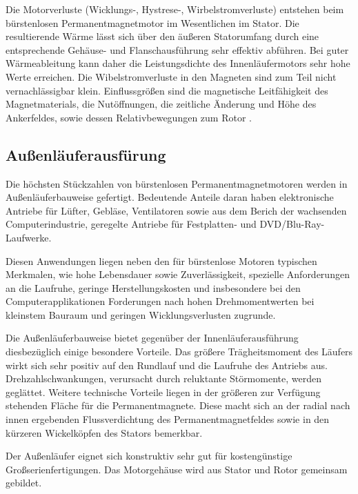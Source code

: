 Die Motorverluste (Wicklungs-, Hystrese-, Wirbelstromverluste) entstehen beim bürstenlosen Permanentmagnetmotor im Wesentlichen im Stator. Die resultierende Wärme lässt sich über den äußeren Statorumfang durch eine entsprechende Gehäuse- und Flanschausführung sehr effektiv abführen. Bei guter Wärmeableitung kann daher die Leistungsdichte des Innenläufermotors sehr hohe Werte erreichen. Die Wibelstromverluste in den Magneten sind zum Teil nicht vernachlässigbar klein. Einflussgrößen sind die magnetische Leitfähigkeit des Magnetmaterials, die Nutöffnungen, die zeitliche Änderung und Höhe des Ankerfeldes, sowie dessen Relativbewegungen zum Rotor \parencite[S.75--76]{Stölting2011}.

\subsection{Außenläuferausfürung}

Die höchsten Stückzahlen von bürstenlosen Permanentmagnetmotoren werden in Außenläuferbauweise gefertigt. Bedeutende Anteile daran haben elektronische Antriebe für Lüfter, Gebläse, Ventilatoren sowie aus dem Berich der wachsenden Computerindustrie, geregelte Antriebe für Festplatten- und DVD/Blu-Ray-Laufwerke.

Diesen Anwendungen liegen neben den für bürstenlose Motoren typischen Merkmalen, wie hohe Lebensdauer sowie Zuverlässigkeit, spezielle Anforderungen an die Laufruhe, geringe Herstellungskosten und insbesondere bei den Computerapplikationen Forderungen nach hohen Drehmomentwerten bei kleinstem Bauraum und geringen Wicklungsverlusten zugrunde.

Die Außenläuferbauweise bietet gegenüber der Innenläuferausführung diesbezüglich einige besondere Vorteile. Das größere Trägheitsmoment des Läufers wirkt sich sehr positiv auf den Rundlauf und die Laufruhe des Antriebs aus. Drehzahlschwankungen, verursacht durch reluktante Störmomente, werden geglättet. Weitere technische Vorteile liegen in der größeren zur Verfügung stehenden Fläche für die Permanentmagnete. Diese macht sich an der radial nach innen ergebenden Flussverdichtung des Permanentmagnetfeldes sowie in den kürzeren Wickelköpfen des Stators bemerkbar.

Der Außenläufer eignet sich konstruktiv sehr gut für kostengünstige Großserienfertigungen. Das Motorgehäuse wird aus Stator und Rotor gemeinsam gebildet.


